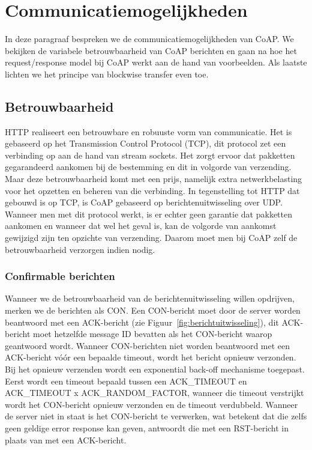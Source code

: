 \newpage

\section{Communicatiemogelijkheden} \label{communicatieMogelijkheden}

In deze paragraaf bespreken we de communicatiemogelijkheden van CoAP. We bekijken de variabele betrouwbaarheid van CoAP berichten en gaan na hoe het request/response model bij CoAP werkt aan de hand van voorbeelden. Als laatste lichten we het principe van blockwise transfer even toe.

\subsection{Betrouwbaarheid} \label{betrouwbaarheid}

HTTP realiseert een betrouwbare en robuuste vorm van communicatie. Het is gebaseerd op het Transmission Control Protocol (TCP), dit protocol zet een verbinding op aan de hand van stream sockets. Het zorgt ervoor dat pakketten gegarandeerd aankomen bij de bestemming en dit in volgorde van verzending. Maar deze betrouwbaarheid komt met een prijs, namelijk extra netwerkbelasting voor het opzetten en beheren van die verbinding. In tegenstelling tot HTTP dat gebouwd is op TCP, is CoAP gebaseerd op berichtenuitwisseling over UDP. Wanneer men met dit protocol werkt, is er echter geen garantie dat pakketten aankomen en wanneer dat wel het geval is, kan de volgorde van aankomst gewijzigd zijn ten opzichte van verzending. Daarom moet men bij CoAP zelf de betrouwbaarheid verzorgen indien nodig.

\subsubsection{Confirmable berichten}

Wanneer we de betrouwbaarheid van de berichtenuitwisseling willen opdrijven, merken we de berichten als CON. Een CON-bericht moet door de server worden beantwoord met een ACK-bericht (zie Figuur~\ref{fig:berichtuitwisseling}), dit ACK-bericht moet hetzelfde message ID bevatten als het CON-bericht waarop geantwoord wordt. Wanneer CON-berichten niet worden beantwoord met een ACK-bericht v\'{o}\'{o}r een bepaalde timeout, wordt het bericht opnieuw verzonden. Bij het opnieuw verzenden wordt een exponential back-off mechanisme toegepast. Eerst wordt een timeout bepaald tussen een ACK\_TIMEOUT en ACK\_TIMEOUT x ACK\_RANDOM\_FACTOR, wanneer die timeout verstrijkt wordt het CON-bericht opnieuw verzonden en de timeout verdubbeld. Wanneer de server niet in staat is het CON-bericht te verwerken, wat betekent dat die zelfs geen geldige error response kan geven, antwoordt die met een RST-bericht in plaats van met een ACK-bericht.

